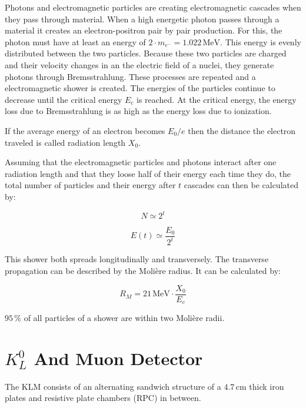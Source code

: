 \documentclass[a4paper,11pt,twosided,final,german,openbib,pdftex,listof=totoc,bibliography=totoc]{scrbook}
\begin{document}
Photons and electromagnetic particles are creating electromagnetic cascades when they pass through material.\cite{leo2012techniques} When a high energetic photon passes through a material it creates an electron-positron pair by pair production. For this, the photon must have at least an energy of $2\cdot m_{e^{-}} = 1.022\,\textrm{MeV}$. This energy is evenly distributed between the two particles. Because these two particles are charged and their velocity changes in an the electric field of a nuclei, they generate photons through Bremsstrahlung. These processes are repeated and a electromagnetic shower is created. The energies of the particles continue to decrease until the critical energy $E_c$ is reached. At the critical energy, the energy loss due to Bremsstrahlung is as high as the energy loss due to ionization.

If the average energy of an electron becomes ${E_0}/{e}$ then the distance the electron traveled is called radiation length $X_0$.

Assuming that the electromagnetic particles and photons interact after one radiation length and that they loose half of their energy each time they do, the total number of particles and their energy after $t$ cascades can then be calculated by:\cite{leo2012techniques}

\begin{equation}
	N \simeq 2^t
\end{equation}

\begin{equation}
	E(t) \simeq \frac{E_0}{2^t}
\end{equation}

This shower both spreads longitudinally and transversely. The transverse propagation can be described by the Moli\`ere radius. It can be calculated by:

\begin{equation}
	R_M=21\,\textrm{MeV}\cdot \frac{X_0}{E_c}
\end{equation}

$ 95\,\%$ of all particles of a shower are within two Moli\`ere radii.\cite{leo2012techniques}

\section{$K_L^0$ And Muon Detector }
\label{sec:KM}

The KLM consists of an alternating sandwich structure of a $4.7\,\textrm{cm}$ thick iron plates and resistive plate chambers (RPC) in between.
\end{document}
